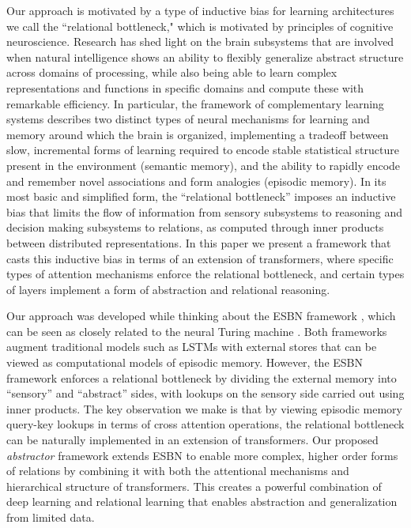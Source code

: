 Our approach is motivated by a type of inductive bias for learning architectures we call the ``relational bottleneck," which is motivated by principles of cognitive neuroscience. Research has shed light on the brain subsystems that are involved when natural intelligence shows an ability to flexibly generalize abstract structure across domains of processing, while also being able to learn complex representations and functions in specific domains and compute these with remarkable efficiency.  In particular, the framework of 
complementary learning systems \citep{McClelland:1995, Kumaran:2016} describes two distinct types of neural mechanisms for learning and memory around which the brain is organized, implementing a tradeoff between slow, incremental forms of learning required to encode stable statistical structure present in the environment (semantic memory), and the ability to rapidly encode and remember novel associations and form analogies (episodic memory). In its most basic and simplified form, the ``relational bottleneck'' imposes an inductive bias that limits the flow of information from sensory subsystems to reasoning and decision making subsystems to relations, as computed through inner products between distributed representations. In this paper we present a framework that casts this inductive bias in terms of 
an extension of transformers, where specific types of attention mechanisms enforce the relational bottleneck, 
and certain types of layers implement a form of abstraction and relational reasoning.

Our approach was developed while thinking about the ESBN framework \citep{esbn}, which can be seen as 
closely related to the neural Turing machine \citep{NTM}. Both frameworks augment traditional models such as 
LSTMs with external stores that can be viewed as computational models of episodic memory. However, the ESBN framework enforces a relational bottleneck by dividing the external memory into ``sensory'' and ``abstract'' sides, with lookups on the sensory side carried out using inner products. The key observation we make is that by viewing episodic  
memory query-key lookups in terms of cross attention operations, the relational bottleneck can be 
naturally implemented in an extension of transformers. Our proposed \textit{abstractor} framework extends ESBN to enable more complex, higher order forms of relations by combining it with both the attentional mechanisms and hierarchical structure of transformers. This creates a powerful combination of deep learning and relational learning that enables abstraction and generalization from limited data.




